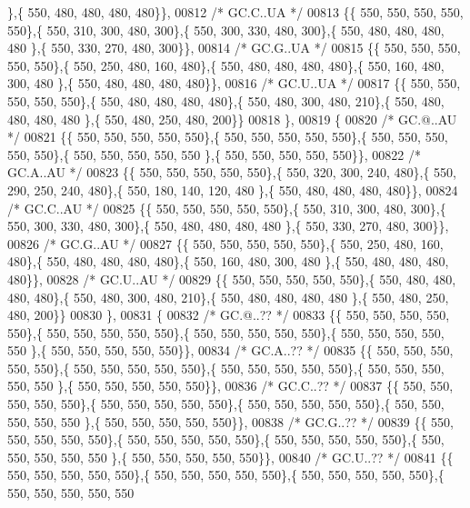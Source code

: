 \begin{DoxyCode}
      \},\{ 550, 480, 480, 480, 480\}\},
00812 \textcolor{comment}{/* GC.C..UA */}
00813 \{\{ 550, 550, 550, 550, 550\},\{ 550, 310, 300, 480, 300\},\{ 550, 300, 330, 480, 300\},\{ 550, 480, 480, 480, 480
      \},\{ 550, 330, 270, 480, 300\}\},
00814 \textcolor{comment}{/* GC.G..UA */}
00815 \{\{ 550, 550, 550, 550, 550\},\{ 550, 250, 480, 160, 480\},\{ 550, 480, 480, 480, 480\},\{ 550, 160, 480, 300, 480
      \},\{ 550, 480, 480, 480, 480\}\},
00816 \textcolor{comment}{/* GC.U..UA */}
00817 \{\{ 550, 550, 550, 550, 550\},\{ 550, 480, 480, 480, 480\},\{ 550, 480, 300, 480, 210\},\{ 550, 480, 480, 480, 480
      \},\{ 550, 480, 250, 480, 200\}\}
00818 \},
00819 \{
00820 \textcolor{comment}{/* GC.@..AU */}
00821 \{\{ 550, 550, 550, 550, 550\},\{ 550, 550, 550, 550, 550\},\{ 550, 550, 550, 550, 550\},\{ 550, 550, 550, 550, 550
      \},\{ 550, 550, 550, 550, 550\}\},
00822 \textcolor{comment}{/* GC.A..AU */}
00823 \{\{ 550, 550, 550, 550, 550\},\{ 550, 320, 300, 240, 480\},\{ 550, 290, 250, 240, 480\},\{ 550, 180, 140, 120, 480
      \},\{ 550, 480, 480, 480, 480\}\},
00824 \textcolor{comment}{/* GC.C..AU */}
00825 \{\{ 550, 550, 550, 550, 550\},\{ 550, 310, 300, 480, 300\},\{ 550, 300, 330, 480, 300\},\{ 550, 480, 480, 480, 480
      \},\{ 550, 330, 270, 480, 300\}\},
00826 \textcolor{comment}{/* GC.G..AU */}
00827 \{\{ 550, 550, 550, 550, 550\},\{ 550, 250, 480, 160, 480\},\{ 550, 480, 480, 480, 480\},\{ 550, 160, 480, 300, 480
      \},\{ 550, 480, 480, 480, 480\}\},
00828 \textcolor{comment}{/* GC.U..AU */}
00829 \{\{ 550, 550, 550, 550, 550\},\{ 550, 480, 480, 480, 480\},\{ 550, 480, 300, 480, 210\},\{ 550, 480, 480, 480, 480
      \},\{ 550, 480, 250, 480, 200\}\}
00830 \},
00831 \{
00832 \textcolor{comment}{/* GC.@..?? */}
00833 \{\{ 550, 550, 550, 550, 550\},\{ 550, 550, 550, 550, 550\},\{ 550, 550, 550, 550, 550\},\{ 550, 550, 550, 550, 550
      \},\{ 550, 550, 550, 550, 550\}\},
00834 \textcolor{comment}{/* GC.A..?? */}
00835 \{\{ 550, 550, 550, 550, 550\},\{ 550, 550, 550, 550, 550\},\{ 550, 550, 550, 550, 550\},\{ 550, 550, 550, 550, 550
      \},\{ 550, 550, 550, 550, 550\}\},
00836 \textcolor{comment}{/* GC.C..?? */}
00837 \{\{ 550, 550, 550, 550, 550\},\{ 550, 550, 550, 550, 550\},\{ 550, 550, 550, 550, 550\},\{ 550, 550, 550, 550, 550
      \},\{ 550, 550, 550, 550, 550\}\},
00838 \textcolor{comment}{/* GC.G..?? */}
00839 \{\{ 550, 550, 550, 550, 550\},\{ 550, 550, 550, 550, 550\},\{ 550, 550, 550, 550, 550\},\{ 550, 550, 550, 550, 550
      \},\{ 550, 550, 550, 550, 550\}\},
00840 \textcolor{comment}{/* GC.U..?? */}
00841 \{\{ 550, 550, 550, 550, 550\},\{ 550, 550, 550, 550, 550\},\{ 550, 550, 550, 550, 550\},\{ 550, 550, 550, 550, 550

\end{DoxyCode}
